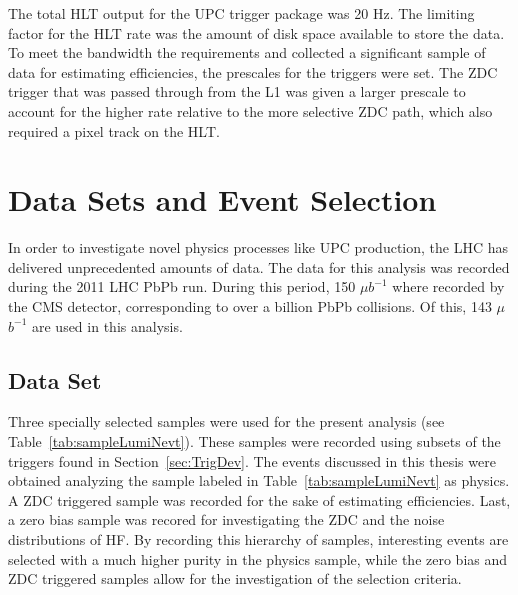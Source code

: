       The total HLT output for the UPC trigger package was 20 Hz. 
      The limiting factor for the HLT rate was the amount of disk space 
        available to store the data. 
      To meet the bandwidth the requirements and collected a significant sample
        of data for estimating efficiencies, the prescales for the triggers 
        were set. 
      The ZDC trigger that was passed through from the L1 was given a larger 
        prescale to account for the higher rate relative to the more selective 
        ZDC path, which also required a pixel track on the HLT.

  \section{\label{sec:DataSetEvSel} Data Sets and Event Selection}
    In order to investigate novel physics processes like UPC \DIFdelbegin {}\DIFdelend \DIFaddbegin {}\DIFaddend production, the LHC has delivered unprecedented amounts of data.
    The data for this analysis was recorded during the 2011 LHC PbPb run. 
    During this period, 150 $\mu$$b^{-1}$ where recorded by the CMS detector,
      corresponding to over a billion PbPb collisions. 
    Of this, 143 $\mu$$b^{-1}$ are used in this analysis.

    \subsection{Data Set}
      Three specially selected samples were used for the present analysis 
        (see Table~\ref{tab:sampleLumiNevt}).
      These samples were recorded using subsets of the triggers found in 
        Section~\ref{sec:TrigDev}.
      The \DIFdelbegin {}\DIFdelend \DIFaddbegin {}\DIFaddend events discussed in this thesis were obtained analyzing the 
        sample labeled in Table~\ref{tab:sampleLumiNevt} as physics.
      A ZDC triggered sample was recorded for the sake of estimating 
        efficiencies.
      Last, a zero bias sample was recored for investigating the ZDC and the 
        noise distributions of HF.
      By recording this hierarchy of samples, interesting events are selected 
        with a much higher purity in the physics sample, while the zero bias and 
      ZDC triggered samples allow for the investigation of the selection 
        criteria. 

